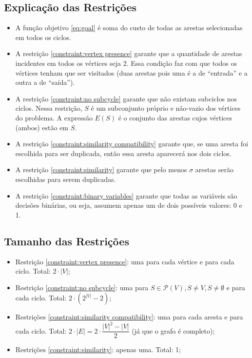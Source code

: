 \documentclass{article}
\newcommand{\partsof}[1]{\ensuremath{\mathcal{P}\left(#1\right)}}
\newcommand{\abs}[1]{\ensuremath{\left| #1 \right|}}
\newcommand{\edges}{\ensuremath{E}}
\newcommand{\vertices}{\ensuremath{V}}
\newcommand{\ncycles}{2}
\newcommand{\subvertices}{\ensuremath{S}}
\newcommand{\similarity}{\ensuremath{\sigma}}
\begin{document}
\subsection{Explicação das Restrições}
\label{subsec: constraints explanation}

\begin{itemize}
    \item A função objetivo \eqref{eq:goal} é soma do custo de todas as arestas selecionadas em todos os ciclos.
    \item A restrição \eqref{constraint:vertex presence} garante que a quantidade de arestas incidentes em todos os vértices seja 2. Essa condição faz com que todos os vértices tenham que ser visitados (duas arestas pois uma é a de ``entrada'' e a outra a de ``saída'').
    \item A restrição \eqref{constraint:no subcycle} garante que não existam subciclos nos ciclos. Nessa restrição, $\subvertices$ é um subconjunto próprio e não-vazio dos vértices do problema. A expressão $\edges(\subvertices)$ é o conjunto das arestas cujos vértices (ambos) estão em $\subvertices$.
    \item A restrição \eqref{constraint:similarity compatibility} garante que, se uma aresta foi escolhida para ser duplicada, então essa aresta aparecerá nos dois ciclos.
    \item A restrição \eqref{constraint:similarity} garante que pelo menos $\similarity$ arestas serão escolhidas para serem duplicadas.
    \item A restrição \eqref{constraint:binary variables} garante que todas as variáveis são decisões binárias, ou seja, assumem apenas um de dois possíveis valores: 0 e 1.
\end{itemize}

\subsection{Tamanho das Restrições}
\label{subsec:constraints size}

\begin{itemize}
	\item Restrição \eqref{constraint:vertex presence}: uma para cada vértice e para cada ciclo. Total: $\ncycles \cdot \abs{\vertices}$;
	\item Restrição \eqref{constraint:no subcycle}: uma para $\subvertices \in \partsof{\vertices}, \subvertices \neq \vertices, \subvertices \neq \emptyset$ e para cada ciclo. Total: $\ncycles \cdot \left( 2^{\abs{\vertices}} - 2\right)$;
	\item Restrições \eqref{constraint:similarity compatibility}: uma para cada aresta e para cada ciclo. Total: $\ncycles \cdot \abs{\edges} = \ncycles \cdot \dfrac{\abs{\vertices}^2 - \abs{\vertices}}{2}$ (já que o grafo é completo);
	\item Restrições \ref{constraint:similarity}: apenas uma. Total: 1;
\end{itemize}
\end{document}
